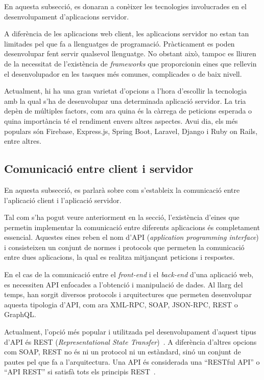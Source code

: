 \documentclass[a4paper,12pt]{ThesisStyle}
\begin{document}
En aquesta subsecció, es donaran a conèixer les tecnologies involucrades en el desenvolupament d'aplicacions servidor.

A diferència de les aplicacions web client, les aplicacions servidor no estan tan limitades pel que fa a llenguatges de programació. Pràcticament es poden desenvolupar fent servir qualsevol llenguatge. No obstant això, tampoc es lliuren de la necessitat de l'existència de \textit{frameworks} que proporcionin eines que rellevin el desenvolupador en les tasques més comunes, complicades o de baix nivell.

Actualment, hi ha una gran varietat d'opcions a l'hora d'escollir la tecnologia amb la qual s'ha de desenvolupar una determinada aplicació servidor. La tria depèn de múltiples factors, com ara quina és la càrrega de peticions esperada o quina importància té el rendiment envers altres aspectes. Avui dia, els més populars són Firebase, Express.js, Spring Boot, Laravel, Django i Ruby on Rails, entre altres.

\subsection{Comunicació entre client i servidor}
\label{subsec:comunicacio_cs}

En aquesta subsecció, es parlarà sobre com s'estableix la comunicació entre l'aplicació client i l'aplicació servidor.

Tal com s'ha pogut veure anteriorment en la secció, l'existència d'eines que permetin implementar la comunicació entre diferents aplicacions és completament essencial. Aquestes eines reben el nom d'API (\textit{application programming interface}) i consisteixen un conjunt de normes i protocols que permeten la comunicació entre dues aplicacions, la qual es realitza mitjançant peticions i respostes.

En el cas de la comunicació entre el \textit{front-end} i el \textit{back-end} d'una aplicació web, es necessiten API enfocades a l'obtenció i manipulació de dades. Al llarg del temps, han sorgit diversos protocols i arquitectures que permeten desenvolupar aquesta tipologia d'API, com ara XML-RPC, SOAP, JSON-RPC, REST o GraphQL.

Actualment, l'opció més popular i utilitzada pel desenvolupament d'aquest tipus d'API és REST (\textit{Representational State Transfer})~\cite{REST}. A diferència d'altres opcions com SOAP, REST no és ni un protocol ni un estàndard, sinó un conjunt de pautes pel que fa a l'arquitectura. Una API és considerada una ``RESTful API'' o ``API REST'' si satisfà tots els principis REST~\cite{REST_CONSTRAINTS}.
\end{document}
